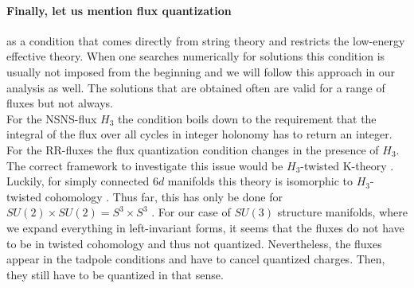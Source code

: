 \documentclass[a4paper,12pt,twoside,openright]{report}
\begin{document}
\paragraph{Finally, let us mention flux quantization} as a condition that comes directly from string theory and restricts the low-energy effective theory. When one searches numerically for solutions this condition is usually not imposed from the beginning and we will follow this approach in our analysis as well. The solutions that are obtained often are valid for a range of fluxes but not always.\\
For the NSNS-flux $H_3$ the condition boils down to the requirement that the integral of the flux over all cycles in integer holonomy has to return an integer. For the RR-fluxes the flux quantization condition changes in the presence of $H_3$. The correct framework to investigate this issue would be $H_3$-twisted K-theory \cite{Moore:1999gb,Minasian:1997mm}. Luckily, for simply connected $6d$ manifolds this theory is isomorphic to $H_3$-twisted cohomology \cite{Collinucci:2006ug}. Thus far, this has only be done for $SU(2)\times SU(2) = S^ 3 \times S^ 3$ \cite{Danielsson:2011au}.
For our case of $SU(3)$ structure manifolds, where we expand everything in left-invariant forms, it seems that the fluxes do not have to be in twisted cohomology and thus not quantized. Nevertheless, the fluxes appear in the tadpole conditions and have to cancel quantized charges. Then, they still have to be quantized in that sense.
\end{document}
